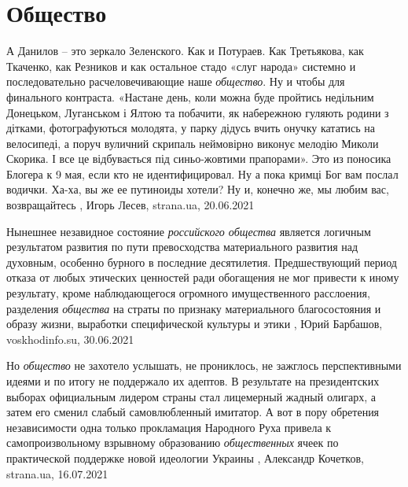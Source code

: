  
 
 
 
 
\chapter{Общество}
\label{sec:slova.obschestvo}

А Данилов – это зеркало Зеленского. Как и Потураев. Как Третьякова, как
Ткаченко, как Резников и как остальное стадо «слуг народа» системно и
последовательно расчеловечивающие наше \emph{общество}.  Ну и чтобы для финального
контраста. «Настане день, коли можна буде пройтись недільним Донецьком,
Луганськом і Ялтою та побачити, як набережною гуляють родини з дітками,
фотографуються молодята, у парку дідусь вчить онучку кататись на велосипеді, а
поруч вуличний скрипаль неймовірно виконує мелодію Миколи Скорика. І все це
відбувається під синьо-жовтими прапорами». Это из поносика Блогера к 9 мая,
если кто не идентифицировал. Ну а пока кримці Бог вам послал водички. Ха-ха, вы
же ее путиноиды хотели? Ну и, конечно же, мы любим вас, возвращайтесь
, 
Игорь Лесев, strana.ua, 20.06.2021

Нынешнее незавидное состояние \emph{российского общества} является логичным
результатом развития по пути превосходства материального развития над духовным,
особенно бурного в последние десятилетия. Предшествующий период отказа от
любых этических ценностей ради обогащения не мог привести к иному результату,
кроме наблюдающегося огромного имущественного расслоения, разделения \emph{общества}
на страты по признаку материального благосостояния и образу жизни, выработки
специфической культуры и этики
, 
Юрий Барбашов, voskhodinfo.su, 30.06.2021

Но \emph{общество} не захотело услышать, не прониклось, не зажглось
перспективными идеями и по итогу не поддержало их адептов. В результате на
президентских выборах официальным лидером страны стал лицемерный жадный
олигарх, а затем его сменил слабый самовлюбленный имитатор.  А вот в пору
обретения независимости одна только прокламация Народного Руха привела к
самопроизвольному взрывному образованию \emph{общественных} ячеек по
практической поддержке новой идеологии Украины
, 
Александр Кочетков, strana.ua, 16.07.2021

